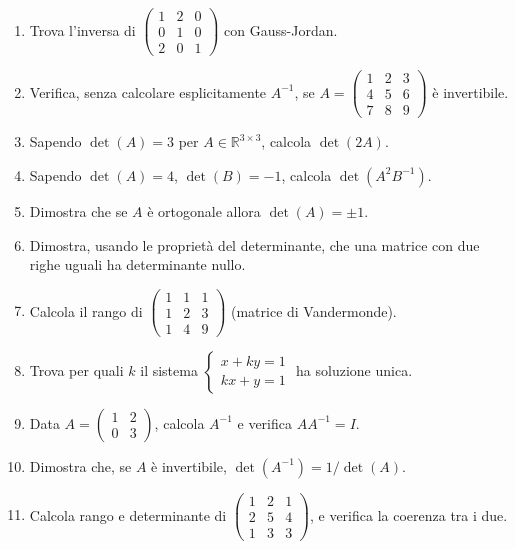 \documentclass[a4paper,11pt]{article}
\begin{document}
\begin{enumerate}
  \item Trova l'inversa di $\begin{pmatrix}1&2&0\\0&1&0\\2&0&1\end{pmatrix}$ con Gauss-Jordan.
  \item Verifica, senza calcolare esplicitamente $A^{-1}$, se $A=\begin{pmatrix}1&2&3\\4&5&6\\7&8&9\end{pmatrix}$ è invertibile.
  \item Sapendo $\det(A)=3$ per $A\in\mathbb R^{3\times3}$, calcola $\det(2A)$.
  \item Sapendo $\det(A)=4$, $\det(B)=-1$, calcola $\det(A^2B^{-1})$.
  \item Dimostra che se $A$ è ortogonale allora $\det(A)=\pm1$.
  \item Dimostra, usando le proprietà del determinante, che una matrice con due righe uguali ha determinante nullo.
  \item Calcola il rango di $\begin{pmatrix}1&1&1\\1&2&3\\1&4&9\end{pmatrix}$ (matrice di Vandermonde).
  \item Trova per quali $k$ il sistema $\begin{cases}x+ky=1\\kx+y=1\end{cases}$ ha soluzione unica.
  \item Data $A=\begin{pmatrix}1&2\\0&3\end{pmatrix}$, calcola $A^{-1}$ e verifica $AA^{-1}=I$.
  \item Dimostra che, se $A$ è invertibile, $\det(A^{-1})=1/\det(A)$.
  \item Calcola rango e determinante di $\begin{pmatrix}1&2&1\\2&5&4\\1&3&3\end{pmatrix}$, e verifica la coerenza tra i due.
\end{enumerate}

\end{document}
